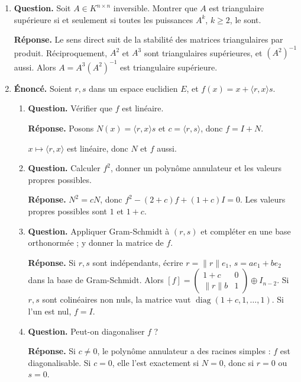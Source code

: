 \documentclass[12pt, a4paper]{article}
\begin{document}
\begin{enumerate}[label=9.\arabic*., start=94]
  \item \begin{minipage}[t]{\linewidth}\raggedright
\textbf{Question.} Soit $A\in K^{n\times n}$ inversible. Montrer que $A$ est triangulaire supérieure si et seulement si toutes les puissances $A^k$, $k\geq2$, le sont.
\par\smallskip
\textbf{Réponse.} Le sens direct suit de la stabilité des matrices triangulaires par produit.
    Réciproquement, $A^2$ et $A^3$ sont triangulaires supérieures, et $(A^2)^{-1}$ aussi.
    Alors $A=A^3(A^2)^{-1}$ est triangulaire supérieure.
\end{minipage}

  \item \begin{minipage}[t]{\linewidth}\raggedright
\textbf{Énoncé.} Soient $r,s$ dans un espace euclidien $E$, et $f(x)=x+\langle r,x\rangle s$.

\begin{enumerate}[\arabic*.]
        \item \textbf{Question.} Vérifier que $f$ est linéaire.
\par\smallskip
\textbf{Réponse.} Posons $N(x)=\langle r,x\rangle s$ et $c=\langle r,s\rangle$, donc $f=I+N$.

$x\mapsto\langle r,x\rangle$ est linéaire, donc $N$ et $f$ aussi.

  \item \textbf{Question.} Calculer $f^2$, donner un polynôme annulateur et les valeurs propres possibles.
\par\smallskip
\textbf{Réponse.} $N^2=cN$, donc $f^2-(2+c)f+(1+c)I=0$.
        Les valeurs propres possibles sont $1$ et $1+c$.

  \item \textbf{Question.} Appliquer Gram-Schmidt à $(r,s)$ et compléter en une base orthonormée ; y donner la matrice de $f$.
\par\smallskip
\textbf{Réponse.} Si $r,s$ sont indépendants, écrire $r=\|r\|e_1$, $s=ae_1+be_2$ dans la base de Gram-Schmidt.
        Alors $[f]=\begin{pmatrix}1+c&0\\\|r\|b&1\end{pmatrix}\oplus I_{n-2}$.
        Si $r,s$ sont colinéaires non nuls, la matrice vaut $\operatorname{diag}(1+c,1,\ldots,1)$.
        Si l'un est nul, $f=I$.

  \item \textbf{Question.} Peut-on diagonaliser $f$ ?
\par\smallskip
\textbf{Réponse.} Si $c\neq0$, le polynôme annulateur a des racines simples : $f$ est diagonalisable.
        Si $c=0$, elle l'est exactement si $N=0$, donc si $r=0$ ou $s=0$.


\end{enumerate}
\end{minipage}
\end{enumerate}
\end{document}
